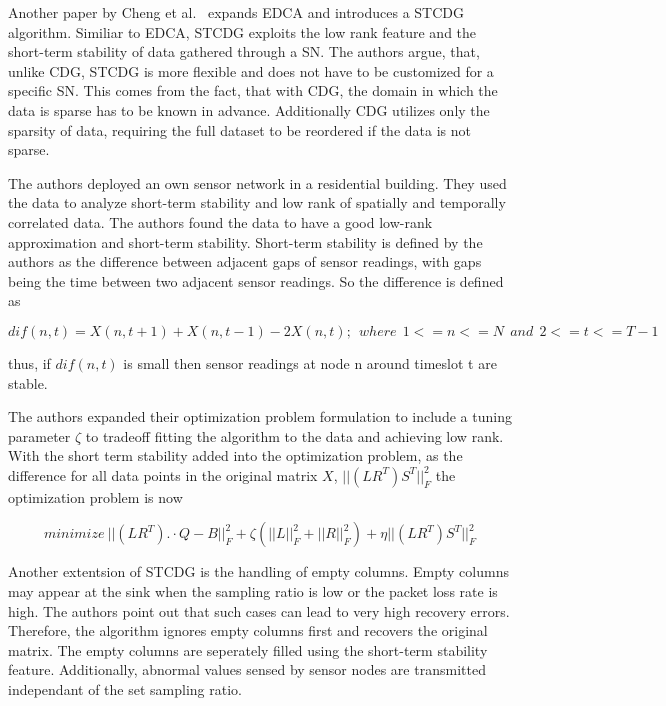 \par

Another paper by Cheng et al.~\cite{cheng2013stcdg} expands \ac{EDCA} and
introduces a \ac{STCDG} algorithm. Similiar to \ac{EDCA}, \ac{STCDG} exploits
the low rank feature and the short-term stability of data gathered through a
\ac{SN}. The authors argue, that, unlike \ac{CDG}, \ac{STCDG} is more flexible
and does not have to be customized for a specific \ac{SN}. This comes from the
fact, that with \ac{CDG}, the domain in which the data is sparse has to be
known in advance. Additionally \ac{CDG} utilizes only the sparsity of data,
requiring the full dataset to be reordered if the data is not sparse.

The authors deployed an own sensor network in a residential building. They used
the data to analyze short-term stability and low rank of spatially and
temporally correlated data. The authors found the data to have a good low-rank
approximation and short-term stability. Short-term stability is defined by the
authors as the difference between adjacent gaps of sensor readings, with gaps
being the time between two adjacent sensor readings. So the difference is
defined as 

$$
dif(n,t) = X(n,t + 1) + X(n,t - 1) - 2X(n, t); \ \ where  \ \ 1 <= n <= N  \ \ and  \ \ 2 <= t <= T - 1
$$

thus, if $ dif(n, t) $ is small then sensor readings at node n around timeslot
t are stable.

The authors expanded their optimization problem formulation to include a tuning
parameter $ \zeta $ to tradeoff fitting the algorithm to the data and achieving
low rank. With the short term stability added into the optimization problem, as
the difference for all data points in the original matrix $ X $, $
||(LR^T)S^T||^2_F $ the optimization problem is now

$$
minimize \ ||(LR^T). \cdot Q-B||^2_F + \zeta(||L||^2_F + ||R||^2_F) + \eta ||(LR^T)S^T||^2_F
$$

Another extentsion of \ac{STCDG} is the handling of empty columns. Empty
columns may appear at the sink when the sampling ratio is low or the packet
loss rate is high. The authors point out that such cases can lead to very high
recovery errors. Therefore, the algorithm ignores empty columns first and
recovers the original matrix. The empty columns are seperately filled using the
short-term stability feature. Additionally, abnormal values sensed by sensor
nodes are transmitted independant of the set sampling ratio.

